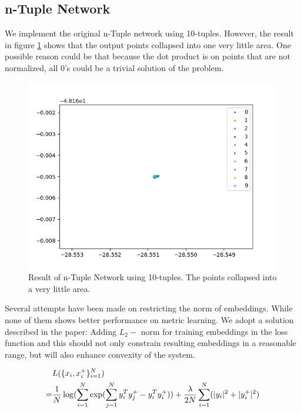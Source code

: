 \documentclass[10pt,twocolumn,letterpaper]{article}
\begin{document}
		\subsection{n-Tuple Network}
			We implement the original n-Tuple network using 10-tuples. However, the result in figure \ref{fig:fail_tuple} shows that the output points collapsed into one very little area.
			One possible reason could be that because the dot product is on points that are not normalized, all 0's could be a trivial solution of the problem.
			
				\begin{figure}[htbp]
					\begin{center}
						\includegraphics[width=0.9\linewidth]{fail_tuple}
					\end{center}
					\caption{Result of n-Tuple Network using 10-tuples. The points collapsed into a very little area.\label{fig:fail_tuple}}
				\end{figure}
			
			Several attempts have been made on restricting the norm of embeddings. While none of them shows better performance on metric learning. We adopt a solution described in the paper: Adding $L_2-$ norm for training embeddings in the loss function and this should not only constrain resulting embeddings in a reasonable range, but will also enhance convexity of the system.
			
			\begin{align}
			&L(\{x_i,x_i^+\}^N_{i=1})\notag\\
			=&\frac{1}{N}\log(\sum_{i=1}^N\exp(\sum_{j=1}^Ny^T_iy_j^+-y_i^Ty_i^+))+ \frac{\lambda}{2N} \sum_{i=1}^N(\lvert y_i\rvert^2+ \lvert y^+_i\rvert^2) \label{eq:pair}
			\end{align}
			
\end{document}
